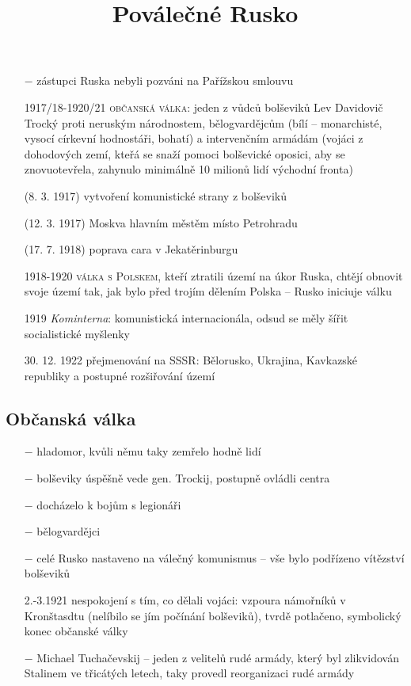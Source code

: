 \documentclass{article}
\title{\vspace{-2cm}\Kapitan Poválečné Rusko\vspace{-1.7cm}}
\date{}
\author{}
\begin{document}
\maketitle

\begin{itemize}
    \vspace{-0.5em}
    \setlength\itemsep{0.15em}
    \item[$-$] zástupci Ruska nebyli pozváni na Pařížskou smlouvu
    \item[1917/18-1920/21] \textsc{občanská válka}: jeden z vůdců bolševiků Lev Davidovič Trocký proti neruským národnostem, bělogvardějcům (bílí -- monarchisté, vysocí církevní hodnostáři, bohatí) a intervenčním armádám (vojáci z dohodových zemí, kteřá se snaží pomoci bolševické oposici, aby se znovuotevřela, zahynulo minimálně 10 milionů lidí východní fronta)
    \item[(8. 3. 1917)] vytvoření komunistické strany z bolševiků
    \item[(12. 3. 1917)] Moskva hlavním městěm místo Petrohradu
    \item[(17. 7. 1918)] poprava cara v Jekatěrinburgu
    \item[1918-1920] \textsc{válka s Polskem}, kteří ztratili území na úkor Ruska, chtějí obnovit svoje území tak, jak bylo před trojím dělením Polska -- Rusko iniciuje válku
    \item[1919] \textit{Kominterna}: komunistická internacionála, odsud se měly šířit socialistické myšlenky
    \item[30. 12. 1922] přejmenování na SSSR: Bělorusko, Ukrajina, Kavkazské republiky a postupné rozšiřování území
\end{itemize}

\subsection*{Občanská válka}
\begin{itemize}
    \vspace{-0.5em}
    \setlength\itemsep{0.15em}
    \item[$-$] hladomor, kvůli němu taky zemřelo hodně lidí
    \item[$-$] bolševiky úspěšně vede gen. Trockij, postupně ovládli centra
    \item[$-$] docházelo k bojům s legionáři
    \item[$-$] bělogvardějci
    \item[$-$] celé Rusko nastaveno na válečný komunismus -- vše bylo podřízeno vítězství bolševiků
    \item[2.-3.1921] nespokojení s tím, co dělali vojáci: vzpoura námořníků v Kronštasdtu (nelíbilo se jím počínání bolševiků), tvrdě potlačeno, symbolický konec občanské války
    \item[$-$] Michael Tuchačevskij -- jeden z velitelů rudé armády, který byl zlikvidován Stalinem ve třicátých letech, taky provedl reorganizaci rudé armády
\end{itemize}
\end{document}
